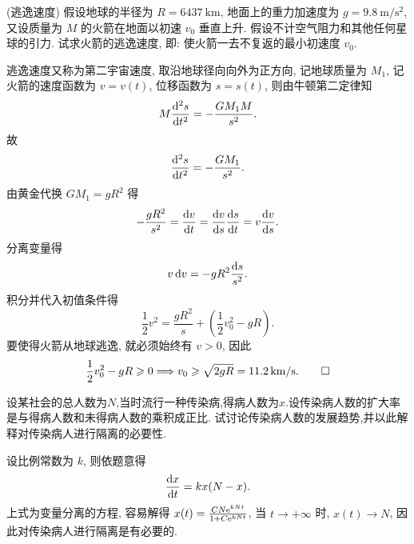 \begin{exercise}(逃逸速度)
  假设地球的半径为 $R=\qty{6437}{\kilo\metre}$,
  地面上的重力加速度为 $g=\qty[per-mode=symbol]{9.8}{\meter\per\square\second}$,
  又设质量为 $M$ 的火箭在地面以初速 $v_0$ 垂直上升.
  假设不计空气阻力和其他任何星球的引力. 试求火箭的逃逸速度, 即: 使火箭一去不复返的最小初速度 $v_0$.
\end{exercise}

\begin{solution}
逃逸速度又称为第二宇宙速度, 取沿地球径向向外为正方向, 记地球质量为 $M_1$,
记火箭的速度函数为 $v=v(t)$, 位移函数为 $s=s(t)$, 则由牛顿第二定律知
\[M\frac{\mathop{}\!\mathrm{d}^2s}{\mathop{}\!\mathrm{d} t^2}=-\frac{GM_1M}{s^2}.\]
故
\[\frac{\mathop{}\!\mathrm{d}^2s}{\mathop{}\!\mathrm{d} t^2}=-\frac{GM_1}{s^2}.\]
由黄金代换 $GM_1=gR^2$ 得
\[-\frac{gR^2}{s^2}=\frac{\diff v}{\diff t}=\frac{\diff v}{\diff s}\frac{\diff s}{\diff t}
  =v\frac{\diff v}{\diff s}.\]
分离变量得
\[v\mathop{}\!\mathrm{d} v=-gR^2\frac{\mathop{}\!\mathrm{d} s}{s^2}.\]
积分并代入初值条件得
\[\frac{1}{2}v^2=\frac{gR^2}{s}+\left(\frac{1}{2}v_0^2-gR\right).\]
要使得火箭从地球逃逸, 就必须始终有 $v>0$, 因此
\[\frac{1}{2}v_0^2-gR\geqslant 0
\Longrightarrow v_0\geqslant\sqrt{2gR}=\qty[per-mode=symbol]{11.2}{\kilo\meter\per\second}.\qedhere\]
\end{solution}



\begin{exercise}
  设某社会的总人数为$N$,当时流行一种传染病,得病人数为$x$.设传染病人数的扩大率是与得病人数和未得病人数的乘积成正比.
  试讨论传染病人数的发展趋势,并以此解释对传染病人进行隔离的必要性.
\end{exercise}

\begin{solution}
  设比例常数为 $k$, 则依题意得
  \[\frac{\mathop{}\!\mathrm{d} x}{\mathop{}\!\mathrm{d} t}=kx(N-x).\]
  上式为变量分离的方程, 容易解得 $x(t)=\frac{CN\mathrm{e}^{kNt}}{1+C\mathrm{e}^{kNt}}$,
  当 $t\to+\infty$ 时, $x(t)\to N$, 因此对传染病人进行隔离是有必要的.
\end{solution}